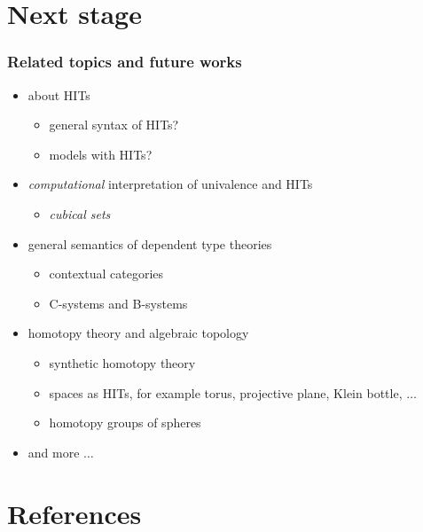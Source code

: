 \documentclass[dvipdfmx]{beamer}
\begin{document}
%

\section{Next stage}

\begin{frame}
  \frametitle{Related topics and future works}
  \begin{itemize}
      \pause
    \item about HITs
      \begin{itemize}
        \item general syntax of HITs?
        \item models with HITs?
      \end{itemize}
      \pause
    \item {\it computational} interpretation of
      univalence and HITs
      \begin{itemize}
        \item {\it cubical sets}
          \cite{bezem_et_al:LIPIcs:2014:4628}
      \end{itemize}
      \pause
    \item general semantics of dependent type theories
      \begin{itemize}
        \item contextual categories
          \cite{Cartmell1986209}
        \item C-systems and B-systems
          \cite{voevodsky2014subsystems,voevodsky2014bsystems}
      \end{itemize}
      \pause
    \item homotopy theory and algebraic topology
      \begin{itemize}
        \item synthetic homotopy theory
        \item spaces as HITs, for example
          torus, projective plane, Klein bottle, $\dots$
        \item homotopy groups of spheres
      \end{itemize}
    \item and more $\dots$
  \end{itemize}
\end{frame}

\section{References}



\end{document}
